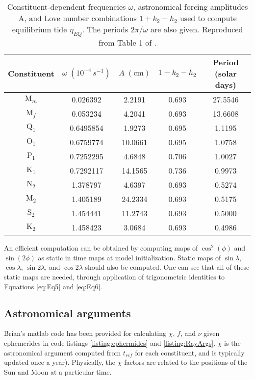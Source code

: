 \begin{table}
\begin{tabular}{|c|c|c|c|c|}
\hline 
Constituent & $\omega\;\left(10^{-4}\,s^{-1}\right)$ & $A\;\left(\textrm{cm}\right)$ & $1+k_{2}-h_{2}$ & Period (solar days)\tabularnewline
\hline 
\hline 
$\textrm{M}_{m}$ & 0.026392 & 2.2191 & 0.693 & 27.5546\tabularnewline
\hline 
$\textrm{M}_{f}$ & 0.053234 & 4.2041 & 0.693 & 13.6608\tabularnewline
\hline 
$\textrm{Q}_{1}$ & 0.6495854 & 1.9273 & 0.695 & 1.1195\tabularnewline
\hline 
$\textrm{O}_{1}$ & 0.6759774 & 10.0661 & 0.695 & 1.0758\tabularnewline
\hline 
$\textrm{P}_{1}$ & 0.7252295 & 4.6848 & 0.706 & 1.0027\tabularnewline
\hline 
$\textrm{K}_{1}$ & 0.7292117 & 14.1565 & 0.736 & 0.9973\tabularnewline
\hline 
$\textrm{N}_{2}$ & 1.378797 & 4.6397 & 0.693 & 0.5274\tabularnewline
\hline 
$\textrm{M}_{2}$ & 1.405189 & 24.2334 & 0.693 & 0.5175\tabularnewline
\hline 
$\textrm{S}_{2}$ & 1.454441 & 11.2743 & 0.693 & 0.5000\tabularnewline
\hline 
$\textrm{K}_{2}$ & 1.458423 & 3.0684 & 0.693 & 0.4986\tabularnewline
\hline 
\end{tabular}
\label{tab:astronimcalFactors}
\caption{Constituent-dependent frequencies $\omega$, astronomical forcing amplitudes A, and Love number combinations $1 + k_2 − h_2$ used to compute equilibrium tide $\eta_{EQ}$. The periods $2\pi/\omega$ are also given. Reproduced from Table 1 of \citet{chassignet_primer_2018,
arbic2004accuracy}.}
\end{table}

An efficient computation can be obtained by computing
maps of $\cos^2(\phi)$ and $\sin(2\phi)$ as static in time maps at model initialization.  Static maps of $\sin \lambda$, $\cos \lambda$, $\sin 2\lambda$, and $\cos 2 \lambda$ should also be computed.  One can see that all of these static maps are needed, through application of trigonometric identities to Equations \ref{eq:Eq5} and \ref{eq:Eq6}.


\subsection{Astronomical arguments}
\label{sec:AstrArg}

Brian's matlab code has been provided for calculating $\chi$, $f$, and $\nu$ given ephemerides in code listings \ref{listing:ephermides} and \ref{listing:RayArgs}.
$\chi$ is the astronomical argument computed from $t_{ref}$ for each constituent, and is typically updated once a year). Physically, the $\chi$ factors are related to the positions of the Sun and Moon at a particular time. 

